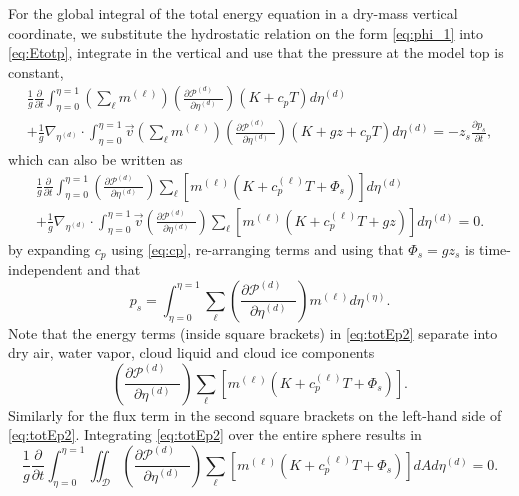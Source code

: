 \documentclass{agujournal}
\begin{document}
For the global integral of the total energy equation in a dry-mass vertical coordinate, we substitute the hydrostatic relation on the form \eqref{eq:phi_1} into \eqref{eq:Etotp}, integrate in the vertical and use that the pressure at the model top is constant,
\begin{multline}
\frac{1}{g}\frac{\partial }{\partial t}\int_{\eta=0}^{\eta=1} \left( \sum_\ell m^{(\ell)}\right) \left( \frac{\partial \mathcal{P}^{(d)}\quad }{\partial \eta^{(d)}} \right)\left(K+c_pT\right)d \eta^{(d)}\\ +\frac{1}{g}\nabla_{\eta^{(d)}} \cdot \int_{\eta=0}^{\eta=1} \vec{v} \left( \sum_\ell m^{(\ell)}\right) \left( \frac{\partial \mathcal{P}^{(d)}\quad }{\partial \eta^{(d)}} \right)\left( K+gz+c_pT \right) d \eta^{(d)} =-z_s\frac{\partial p_s}{\partial t},\label{eq:tmp99}
\end{multline}
which can also be written as
\begin{multline}
\frac{1}{g}\frac{\partial }{\partial t}\int_{\eta=0}^{\eta=1} \left( \frac{\partial \mathcal{P}^{(d)}\quad }{\partial \eta^{(d)}} \right)\sum_\ell \left[m^{(\ell)} \left(K+c_p^{(\ell)}T+\Phi_s  \right)\right]d \eta^{(d)}\\ +\frac{1}{g}\nabla_{\eta^{(d)}} \cdot \int_{\eta=0}^{\eta=1} \vec{v} \left( \frac{\partial \mathcal{P}^{(d)}\quad }{\partial \eta^{(d)}} \right)\sum_\ell \left[ m^{(\ell)}\left(K+c_p^{(\ell)}T+gz\right) \right]d \eta^{(d)} =0.\label{eq:totEp2}
\end{multline}
by expanding $c_p$ using \eqref{eq:cp}, re-arranging terms and using that $\Phi_s=gz_s$ is time-independent and that 
\begin{equation}
p_s=\int_{\eta=0}^{\eta=1}\sum_\ell  \left( \frac{\partial \mathcal{P}^{(d)}\quad }{\partial \eta^{(d)}}\right) m^{(\ell)}d\eta^{(\eta)}.
\end{equation}
Note that the energy terms (inside square brackets) in \eqref{eq:totEp2} separate into dry air, water vapor, cloud liquid and cloud ice components
\begin{equation}
\left( \frac{\partial \mathcal{P}^{(d)}\quad }{\partial \eta^{(d)}} \right)\sum_\ell \left[ m^{(\ell)}\left(K+c_p^{(\ell)}T+\Phi_s\right)\right].
\end{equation}
Similarly for the flux term in the second square brackets on the left-hand side of \eqref{eq:totEp2}. Integrating \eqref{eq:totEp2} over the entire sphere results in
\begin{equation}
\frac{1}{g}\frac{\partial }{\partial t}\int_{\eta=0}^{\eta=1} \iint_\mathcal{D} \left( \frac{\partial \mathcal{P}^{(d)}\quad }{\partial \eta^{(d)}} \right)\sum_\ell \left[m^{(\ell)} \left(K+c_p^{(\ell)}T+\Phi_s  \right)\right]  dA d \eta^{(d)}=0.\label{eq:comprehensice_energy}
\end{equation}
\end{document}

